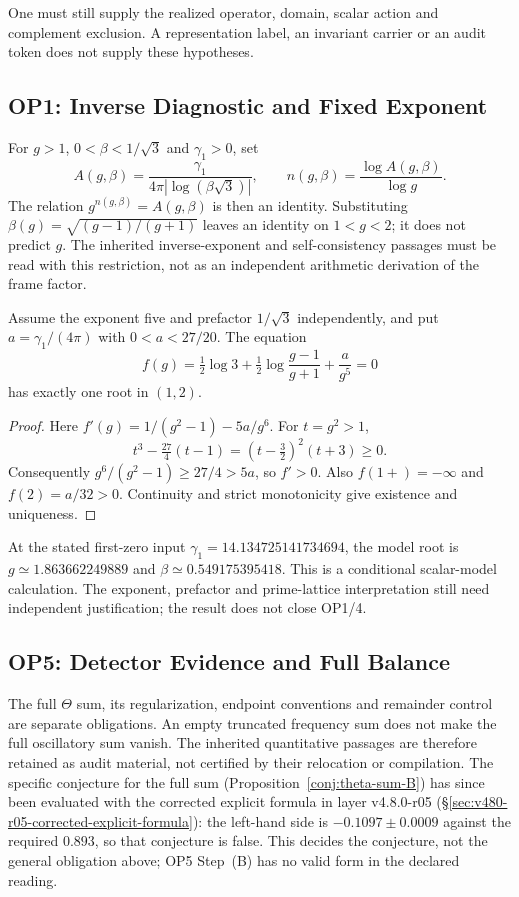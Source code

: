 One must still supply the realized operator, domain, scalar action and
complement exclusion. A representation label, an invariant carrier or
an audit token does not supply these hypotheses.

\subsection{OP1: Inverse Diagnostic and Fixed Exponent}
\label{v480:exponent-premises}

For $g>1$, $0<\beta<1/\sqrt3$ and $\gamma_1>0$, set
\[
 A(g,\beta)=\frac{\gamma_1}{4\pi|\log(\beta\sqrt3)|},
 \qquad n(g,\beta)=\frac{\log A(g,\beta)}{\log g}.
\]
The relation $g^{n(g,\beta)}=A(g,\beta)$ is then an identity.
Substituting $\beta(g)=\sqrt{(g-1)/(g+1)}$ leaves an identity on
$1<g<2$; it does not predict $g$. The inherited inverse-exponent
and self-consistency passages must be read with this restriction,
not as an independent arithmetic derivation of the frame factor.

\begin{proposition}
\label{v480:fixed-exponent}
Assume the exponent five and prefactor $1/\sqrt3$ independently,
and put $a=\gamma_1/(4\pi)$ with $0<a<27/20$. The equation
\[
 f(g)=\tfrac12\log3+\tfrac12\log\frac{g-1}{g+1}
                   +\frac{a}{g^5}=0
\]
has exactly one root in $(1,2)$.
\end{proposition}
\begin{proof}
Here $f'(g)=1/(g^2-1)-5a/g^6$. For $t=g^2>1$,
\[
 t^3-\tfrac{27}{4}(t-1)=(t-\tfrac32)^2(t+3)\geq0.
\]
Consequently $g^6/(g^2-1)\geq27/4>5a$, so $f'>0$.
Also $f(1+)=-\infty$ and $f(2)=a/32>0$. Continuity and strict
monotonicity give existence and uniqueness.
\end{proof}

At the stated first-zero input $\gamma_1=14.134725141734694$,
the model root is $g\simeq1.863662249889$ and
$\beta\simeq0.549175395418$. This is a conditional scalar-model
calculation. The exponent, prefactor and prime-lattice interpretation
still need independent justification; the result does not close OP1/4.

\subsection{OP5: Detector Evidence and Full Balance}
\label{v480:op5-premises}

The full $\Theta$ sum, its regularization, endpoint conventions and
remainder control are separate obligations. An empty truncated
frequency sum does not make the full oscillatory sum vanish.
The inherited quantitative passages are therefore retained as audit
material, not certified by their relocation or compilation.
The specific conjecture for the full sum
(Proposition~\ref{conj:theta-sum-B}) has since been evaluated with the
corrected explicit formula in layer v4.8.0-r05
(\S\ref{sec:v480-r05-corrected-explicit-formula}): the left-hand side is
$-0.1097\pm0.0009$ against the required $0.893$, so that conjecture is
false. This decides the conjecture, not the general obligation above;
OP5 Step~(B) has no valid form in the declared reading.

